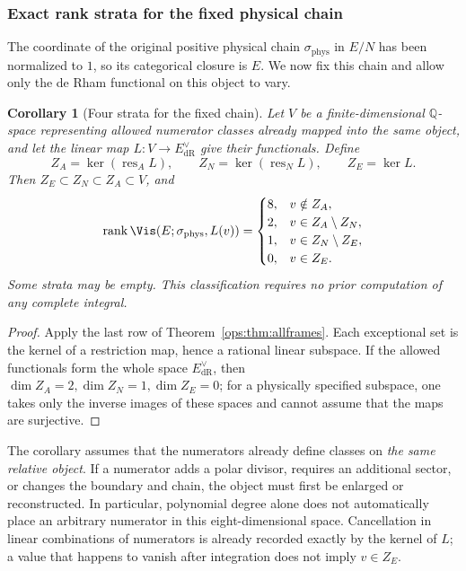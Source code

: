 \documentclass[11pt,a4paper,oneside]{article}
\theoremstyle{plain}
\newtheorem{corollary}[theorem]{Corollary}
\theoremstyle{definition}
\theoremstyle{remark}
\newcommand{\Q}{\mathbb Q}
\newcommand{\rank}{\operatorname{rank}}
\newcommand{\dR}{\mathrm{dR}}
\numberwithin{equation}{section}
\begin{document}
\subsubsection{Exact rank strata for the fixed physical chain}
The coordinate of the original positive physical chain $\sigma_{\mathrm{phys}}$ in $E/N$ has been normalized to $1$,
so its categorical closure is $E$.
We now fix this chain and allow only the de Rham functional on this object to vary.
\begin{corollary}[Four strata for the fixed chain]\label{ops:cor:numerators}
Let $V$ be a finite-dimensional $\Q$-space representing allowed numerator classes already mapped into the same object,
and let the linear map $L:V\to E_{\dR}^{\vee}$ give their functionals.
Define
\begin{equation}\label{ops:eq:exceptional}
 Z_A=\ker(\operatorname{res}_A L),\qquad
 Z_N=\ker(\operatorname{res}_N L),\qquad Z_E=\ker L.
\end{equation}
Then $Z_E\subset Z_N\subset Z_A\subset V$, and
\begin{equation}\label{ops:eq:rankstrata}
 \rank\Vis(E;\sigma_{\mathrm{phys}},L(v))=
 \begin{cases}
 8,&v\notin Z_A,\\
 2,&v\in Z_A\setminus Z_N,\\
 1,&v\in Z_N\setminus Z_E,\\
 0,&v\in Z_E.
 \end{cases}
\end{equation}
Some strata may be empty. This classification requires no prior computation of any complete integral.
\end{corollary}
\begin{proof}
Apply the last row of Theorem~\ref{ops:thm:allframes}.
Each exceptional set is the kernel of a restriction map, hence a rational linear subspace.
If the allowed functionals form the whole space $E_{\dR}^{\vee}$, then
$\dim Z_A=2,\dim Z_N=1,\dim Z_E=0$;
for a physically specified subspace, one takes only the inverse images of these spaces and cannot assume that the maps are surjective.
\end{proof}

The corollary assumes that the numerators already define classes on \emph{the same relative object}.
If a numerator adds a polar divisor, requires an additional sector, or changes the boundary and chain, the object must first be enlarged or reconstructed.
In particular, polynomial degree alone does not automatically place an arbitrary numerator in this eight-dimensional space.
Cancellation in linear combinations of numerators is already recorded exactly by the kernel of $L$;
a value that happens to vanish after integration does not imply $v\in Z_E$.
\end{document}
